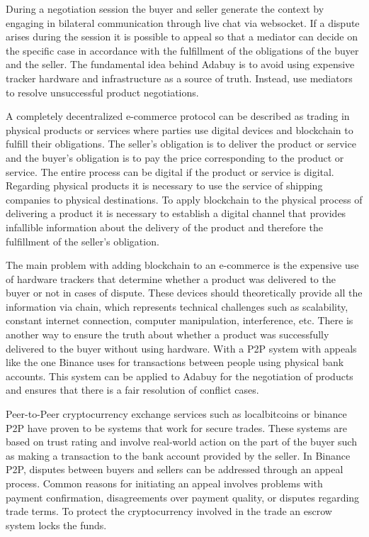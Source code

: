 \documentclass[12pt]{article}
\begin{document}
During a negotiation session the buyer and seller generate the context by engaging in bilateral communication through live chat via websocket.
If a dispute arises during the session it is possible to appeal so that a mediator can decide on the specific case in accordance with the fulfillment of the obligations of the buyer and the seller. The fundamental idea behind Adabuy is to avoid using expensive tracker hardware and infrastructure as a source of truth. Instead, use mediators to resolve unsuccessful product negotiations.

A completely decentralized e-commerce protocol can be described as trading in physical products or services where parties use digital devices and blockchain to fulfill their obligations.
The seller's obligation is to deliver the product or service and the buyer's obligation is to pay the price corresponding to the product or service. 
The entire process can be digital if the product or service is digital.
Regarding physical products it is necessary to use the service of shipping companies to physical destinations.
To apply blockchain to the physical process of delivering a product it is necessary to establish a digital channel that provides infallible information about the delivery of the product and therefore the fulfillment of the seller's obligation. 

The main problem with adding blockchain to an e-commerce is the expensive use of hardware trackers that determine whether a product was delivered to the buyer or not in cases of dispute. These devices should theoretically provide all the information via chain, which represents technical challenges such as scalability, constant internet connection, computer manipulation, interference, etc. There is another way to ensure the truth about whether a product was successfully delivered to the buyer without using hardware. With a P2P system with appeals like the one Binance uses for transactions between people using physical bank accounts. This system can be applied to Adabuy for the negotiation of products and ensures that there is a fair resolution of conflict cases.

Peer-to-Peer cryptocurrency exchange services such as localbitcoins or binance P2P have proven to be systems that work for secure trades. These systems are based on trust rating and involve real-world action on the part of the buyer such as making a transaction to the bank account provided by the seller. In Binance P2P, disputes between buyers and sellers can be addressed through an appeal process. Common reasons for initiating an appeal involves problems with payment confirmation, disagreements over payment quality, or disputes regarding trade terms. To protect the cryptocurrency involved in the trade an escrow system locks the funds.
\end{document}
